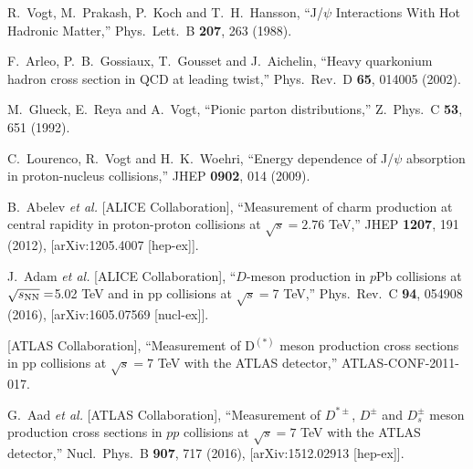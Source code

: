 \documentclass[12pt,a4paper,final]{iopart} %
\begin{document}
\begin{thebibliography}{100}
  
  R.~Vogt, M.~Prakash, P.~Koch and T.~H.~Hansson,
  ``J/$\psi$ Interactions With Hot Hadronic Matter,''
  Phys.\ Lett.\ B {\bf 207}, 263 (1988).

  F.~Arleo, P.~B.~Gossiaux, T.~Gousset and J.~Aichelin,
  ``Heavy quarkonium hadron cross section in QCD at leading twist,''
  Phys.\ Rev.\ D {\bf 65}, 014005 (2002).

  M.~Glueck, E.~Reya and A.~Vogt,
  ``Pionic parton distributions,''
  Z.\ Phys.\ C {\bf 53}, 651 (1992).

  C.~Lourenco, R.~Vogt and H.~K.~Woehri,
  ``Energy dependence of J/$\psi$ absorption in proton-nucleus collisions,''
  JHEP {\bf 0902}, 014 (2009).










  



  B.~Abelev {\it et al.} [ALICE Collaboration],
  ``Measurement of charm production at central rapidity in proton-proton collisions at $\sqrt{s}=2.76$ TeV,''
  JHEP {\bf 1207}, 191 (2012),
  [arXiv:1205.4007 [hep-ex]].
  
  J.~Adam {\it et al.} [ALICE Collaboration],
  ``$D$-meson production in $p$Pb collisions at $\sqrt{s_{\rm NN}}=$5.02 TeV and in pp collisions at $\sqrt{s}=$7 TeV,''
  Phys.\ Rev.\ C {\bf 94}, 054908 (2016),
  [arXiv:1605.07569 [nucl-ex]].
  
  [ATLAS Collaboration],
  ``Measurement of D$^(*)$ meson production cross sections in pp collisions at $ \sqrt{s}=7$ TeV with the ATLAS detector,''
  ATLAS-CONF-2011-017.
 
  G.~Aad {\it et al.} [ATLAS Collaboration],
  ``Measurement of $D^{*\pm}$, $D^\pm$ and $D_s^\pm$ meson production cross sections in $pp$ collisions at $\sqrt{s}=7$ TeV with the ATLAS detector,''
  Nucl.\ Phys.\ B {\bf 907}, 717 (2016),
  [arXiv:1512.02913 [hep-ex]].
 



\end{thebibliography}
\end{document}
